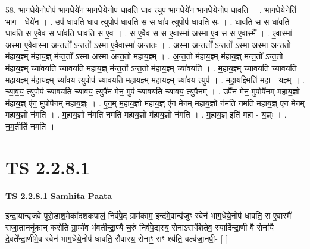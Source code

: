 \documentclass[17pt]{extarticle}
\begin{document}
58. भा॒ग॒धेये॒नोपोप॑ भाग॒धेये॑न भाग॒धेये॒नोप॑ धावति धाव॒ त्युप॑ भाग॒धेये॑न भाग॒धेये॒नोप॑ धावति । . भा॒ग॒धेये॒नेति॑ भाग - धेये॑न । . उप॑ धावति धाव॒ त्युपोप॑ धावति॒ स स धा॑व॒ त्युपोप॑ धावति॒ सः । . धा॒व॒ति॒ स स धा॑वति धावति॒ स ए॒वैव स धा॑वति धावति॒ स ए॒व । . स ए॒वैव स स ए॒वास्मा॑ अस्मा ए॒व स स ए॒वास्मै᳚ । . ए॒वास्मा॑ अस्मा ए॒वैवास्मा॑ अन्त॒तो᳚ ऽन्त॒तो᳚ ऽस्मा ए॒वैवास्मा॑ अन्त॒तः । . अ॒स्मा॒ अ॒न्त॒तो᳚ ऽन्त॒तो᳚ ऽस्मा अस्मा अन्त॒तो म॑हाय॒ज्ञ्म् म॑हाय॒ज्ञ् म॑न्त॒तो᳚ ऽस्मा अस्मा अन्त॒तो म॑हाय॒ज्ञ्म् । . अ॒न्त॒तो म॑हाय॒ज्ञ्म् म॑हाय॒ज्ञ् म॑न्त॒तो᳚ ऽन्त॒तो म॑हाय॒ज्ञ्म् च्या॑वयति च्यावयति महाय॒ज्ञ् म॑न्त॒तो᳚ ऽन्त॒तो म॑हाय॒ज्ञ्म् च्या॑वयति । . म॒हा॒य॒ज्ञ्म् च्या॑वयति च्यावयति महाय॒ज्ञ्म् म॑हाय॒ज्ञ्म् च्या॑वय॒ त्युपोप॑ च्यावयति महाय॒ज्ञ्म् म॑हाय॒ज्ञ्म् च्या॑वय॒ त्युप॑ । . म॒हा॒य॒ज्ञ्मिति॑ महा - य॒ज्ञ्म् । . च्या॒व॒य॒ त्युपोप॑ च्यावयति च्यावय॒ त्युपै॑न मेन॒ मुप॑ च्यावयति च्यावय॒ त्युपै॑नम् । . उपै॑न मेन॒ मुपोपै॑नम् महाय॒ज्ञो म॑हाय॒ज्ञ् ए॑न॒ मुपोपै॑नम् महाय॒ज्ञ्ः । . ए॒न॒म् म॒हा॒य॒ज्ञो म॑हाय॒ज्ञ् ए॑न मेनम् महाय॒ज्ञो न॑मति नमति महाय॒ज्ञ् ए॑न मेनम् महाय॒ज्ञो न॑मति । . म॒हा॒य॒ज्ञो न॑मति नमति महाय॒ज्ञो म॑हाय॒ज्ञो न॑मति । . म॒हा॒य॒ज्ञ् इति॑ महा - य॒ज्ञ्ः । . न॒म॒तीति॑ नमति । \newline
\pagebreak
{}
\section*{ TS 2.2.8.1 }

\textbf{TS 2.2.8.1 } \newline
\textbf{Samhita Paata} \newline

इन्द्रा॒यान्वृ॑जवे पुरो॒डाश॒मेका॑दशकपालं॒ निर्व॑पे॒द् ग्राम॑काम॒ इन्द्र॑मे॒वान्वृ॑जुꣳ॒॒ स्वेन॑ भाग॒धेये॒नोप॑ धावति॒ स ए॒वास्मै॑ सजा॒ताननु॑कान् करोति ग्रा॒म्ये॑व भ॑वतीन्द्रा॒ण्यै च॒रुं निर्व॑पे॒द्यस्य॒ सेनाऽसꣳ॑शितेव॒ स्यादि॑न्द्रा॒णी वै सेना॑यै दे॒वते᳚न्द्रा॒णीमे॒व स्वेन॑ भाग॒धेये॒नोप॑ धावति॒ सैवास्य॒ सेनाꣳ॒॒ सꣳ श्य॑ति॒ बल्ब॑जा॒नपी॒-  [  ] \newline
\end{document}
